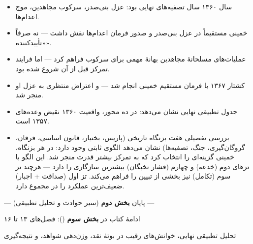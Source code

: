 \begin{principleBox}
\begin{itemize}[label=\textcolor{cPrimary}{$\blacksquare$}, rightmargin=2em]
    \item سال ۱۳۶۰ سال تصفیه‌های نهایی بود: عزل بنی‌صدر، سرکوب مجاهدین، موج اعدام‌ها.
    \item خمینی مستقیماً در عزل بنی‌صدر و صدور فرمان اعدام‌ها نقش داشت — نه صرفاً «تأییدکننده».
    \item عملیات‌های مسلحانهٔ مجاهدین بهانهٔ مهمی برای سرکوب فراهم کرد — اما فرایند تمرکز قبل از آن شروع شده بود.
    \item کشتار ۱۳۶۷ با فرمان مستقیم خمینی انجام شد — و اعتراض منتظری به عزل او منجر شد.
    \item جدول تطبیقی نهایی نشان می‌دهد: در  ده محور، واقعیت ۱۳۶۰ نقیض وعده‌های ۱۳۵۷ است.
    \item {} بررسی تفصیلی هفت بزنگاه تاریخی (پاریس، بختیار، قانون اساسی، فرقان، گروگان‌گیری، جنگ، تصفیه‌ها) نشان می‌دهد الگوی ثابتی وجود دارد: در هر بزنگاه، خمینی گزینه‌ای را انتخاب کرد که به تمرکز بیشتر قدرت منجر شد. این الگو با تزهای دوم (خدعه) و چهارم (فشار نخبگان) بیشترین سازگاری را دارد — هرچند تز سوم (تکامل) نیز بخشی از تبیین را فراهم می‌کند. تز اول (صداقت + اجبار) ضعیف‌ترین عملکرد را در مجموع دارد.
\end{itemize}
\end{principleBox}

\vspace{1cm}

\begin{center}

\vspace{0.5cm}
{\small\color{cGray} — پایان \textbf{بخش دوم} (سیر حوادث و تحلیل تطبیقی) —}

\vspace{0.3cm}
{\small\color{cGray} ادامهٔ کتاب در \textbf{بخش سوم} (): فصل‌های ۱۳ تا ۱۶}

\vspace{0.2cm}
{\small\color{cGray} تحلیل تطبیقی نهایی، خوانش‌های رقیب در بوتهٔ نقد، وزن‌دهی شواهد، و نتیجه‌گیری}
\end{center}